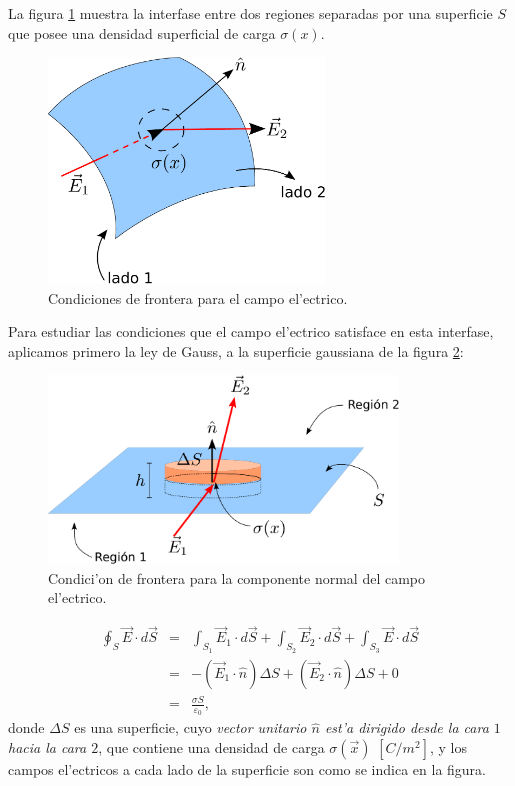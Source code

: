 La figura \ref{DSCE1} muestra la interfase entre dos regiones separadas por una
superficie $S$ que posee una densidad superficial de carga $\sigma(x)$.
\begin{figure}[!h]
\centerline{\includegraphics[height=6cm]{fig/fig-superficie-frontera.pdf}}
\caption{Condiciones de frontera para el campo el'ectrico.}
\label{DSCE1}
\end{figure}
Para estudiar las condiciones que el campo el'ectrico satisface en esta
interfase, aplicamos primero la ley de Gauss, a la superficie gaussiana de la
figura \ref{DSCE2}:
\begin{figure}[!h]
\centerline{\includegraphics[height=5cm]{fig/fig-condicion-borde-electrico-01.pdf}}
\caption{Condici'on de frontera para la componente normal del campo el'ectrico.}
\label{DSCE2}
\end{figure}
\begin{eqnarray}
\oint_{S} \vec{E}\cdot d\vec{S}&=&\int_{S_1}
\vec{E}_1\cdot d\vec{S}+\int_{S_2} \vec{E}_2 \cdot d\vec{S}+\int_{S_3}
\vec{E}\cdot d\vec{S}\\
&=& -(\vec{E}_1\cdot\hat{n})\Delta S+(\vec{E}_2\cdot\hat{n})\Delta S+0\\
&=& \frac{\sigma S}{\varepsilon_0},
\end{eqnarray}
donde $\Delta S$ es una superficie, cuyo \textit{vector unitario $\hat{n}$ est'a dirigido
desde la cara $1$ hacia la cara $2$}, que contiene una densidad de carga
$\sigma(\vec{x})$ $\left[ C/m^2\right]  $, y los campos el'ectricos a
cada lado de la superficie son como se indica en la figura.

